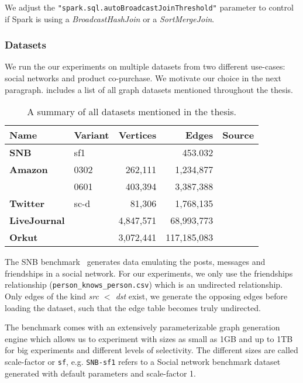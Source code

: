 We adjust the \texttt{"spark.sql.autoBroadcastJoinThreshold"} parameter to control
if Spark is using a \textit{BroadcastHashJoin} or a \textit{SortMergeJoin}.

\subsubsection{Datasets}
We run the our experiments on multiple datasets from two different use-cases: social networks and product co-purchase.
We motivate our choice in the next paragraph.
 includes a list of all graph datasets mentioned throughout the thesis.

\begin{table}[]
    \centering
    \begin{tabular}{llrrl} \toprule
        Name    & Variant              &  Vertices   & Edges          & Source          \\ \midrule
        \textbf{SNB}         & sf1     &             &  453.032       & \cite{snb}      \\
        \textbf{Amazon}      & 0302    & 262,111     &  1,234,877     & \cite{snapnets} \\
                             & 0601    & 403,394     &  3,387,388     & \cite{snapnets} \\
        \textbf{Twitter}     & sc-d    & 81,306      &  1,768,135     & \cite{snapnets} \\
        \textbf{LiveJournal} &         & 4,847,571   & 68,993,773     & \cite{snapnets} \\
        \textbf{Orkut}       &         & 3,072,441   & 117,185,083    & \cite{snapnets} \\ \bottomrule
    \end{tabular}
    \caption{A summary of all datasets mentioned in the thesis.}
    \label{table:datasets}
\end{table}

The SNB benchmark~\cite{snb} generates data emulating the posts, messages and friendships in a social network.
For our experiments, we only use the friendships relationship (\texttt{person\_knows\_person.csv}) which is an undirected relationship.
Only edges of the kind \textit{src $<$ dst} exist, we generate the opposing edges before loading the dataset, such
that the edge table becomes truly undirected.

The benchmark comes with an extensively parameterizable graph generation engine
which allows us to experiment with sizes as small as 1GB and up to 1TB for big experiments and different levels of selectivity.
The different sizes are called scale-factor or \texttt{sf}, e.g. \texttt{SNB-sf1} refers to a Social network benchmark dataset generated with
default parameters and scale-factor 1.

